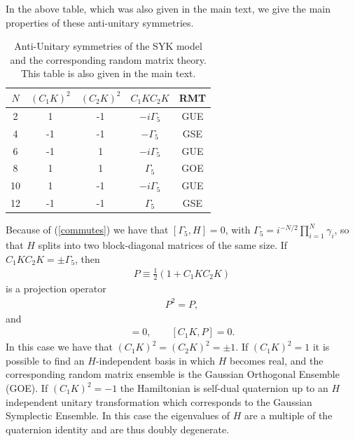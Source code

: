 \documentclass[aps,showpacs,floatfix,superscriptaddress,pre,11pt]{revtex4-1}
\newcommand{\eref}[1]{(\ref{#1})}
\newcommand{\be}{\begin{eqnarray}}
\newcommand{\ee}{\end{eqnarray}}
\begin{document}
      In the above table, which was also given in the main text,
      we give the main properties of these anti-unitary symmetries.
     \begin{table}
   \begin{tabular}{c|c|c|c|c}
       $N$   &$ (C_1 K)^2$ & $(C_2K)^2$ &$C_1KC_2K$ &   RMT\\
       \hline
       2  &     1   &       -1    & $-i\Gamma_5$  & GUE \\
       4  &    -1   &       -1    & $-\Gamma_5 $   & GSE \\
       6  &    -1   &        1    & $-i\Gamma_5$   & GUE \\
       8  &     1   &        1    & $\Gamma_5  $   & GOE \\
       10 &     1   &       -1    & $-i\Gamma_5$   & GUE \\
       12 &    -1   &       -1    & $\Gamma_5$     & GSE \\
   \end{tabular}
   \caption{Anti-Unitary symmetries of the SYK model and the corresponding random matrix
     theory. This table is also given in the main text.}
       \end{table}
     Because of \eref{commutes} we have that $[\Gamma_5, H] = 0$, with $\Gamma_5 = i^{-N/2} \prod_{i=1}^{N} \gamma_i$, so that $H$ splits
     into two block-diagonal matrices of the same size. 
     If $C_1KC_2K=\pm \Gamma_5$, then
     \be
     P \equiv \frac 12(1+ C_1K C_2K)
     \ee
     is a projection operator
     \be
     P^2 = P,
     \ee
     and
     \be
        [P,H] = 0, \qquad [C_1K,P]=0.
        \ee
        In this case we have that $(C_1K)^2=(C_2K)^2=\pm 1$. If $(C_1K)^2 =1 $ it is possible to find
        an $H$-independent basis in which $H$ becomes real, and the corresponding random matrix ensemble
        is the Gaussian Orthogonal Ensemble (GOE). If $(C_1K)^2 =-1 $ the Hamiltonian is self-dual
        quaternion up to an $H$ independent unitary transformation which corresponds to the
        Gaussian Symplectic Ensemble. In this case the eigenvalues of $H$ are a multiple of the
        quaternion identity and are thus doubly degenerate.
        
\end{document}
